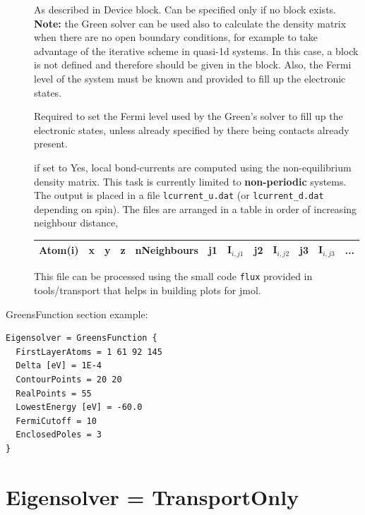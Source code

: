 \begin{description}
\item[] As described in Device block. Can be specified only
  if no  block exists.  {\bf Note:} the Green solver can be used
  also to calculate the density matrix when there are no open boundary
  conditions, for example to take advantage of the iterative scheme in quasi-1d
  systems. In this case, a  block is not defined and therefore
   should be given in the  block. Also,
  the Fermi level of the system must be known and provided to fill up the
  electronic states.

\item[] Required to set the Fermi level
  used by the Green's solver to fill up the electronic states, unless already
  specified by there being contacts already present.

\item[] if set to Yes, local bond-currents are computed using
  the non-equilibrium density matrix.  This task is currently limited to
  \textbf{non-periodic} systems. The output is placed in a file
  \verb|lcurrent_u.dat| (or \verb|lcurrent_d.dat| depending on spin).  The files
  are arranged in a table in order of increasing neighbour distance,

\begin{tabular}{|c|c|c|c|c|c|c|c|c|c|c|c|}
  \hline
  Atom(i) & x & y & z &  nNeighbours &  j1 & I$_{i,j1}$ & j2 & I$_{i,j2}$ &  j3 & I$_{i,j3}$ & ...\\
  \hline
\end{tabular}

  This file can be processed using the small code \verb|flux| provided in
  tools/transport that helps in building plots for jmol.
\end{description}

GreensFunction section example:

\begin{verbatim}
Eigensolver = GreensFunction {
  FirstLayerAtoms = 1 61 92 145
  Delta [eV] = 1E-4
  ContourPoints = 20 20
  RealPoints = 55
  LowestEnergy [eV] = -60.0
  FermiCutoff = 10
  EnclosedPoles = 3
}
\end{verbatim}


\section{Eigensolver = TransportOnly}

